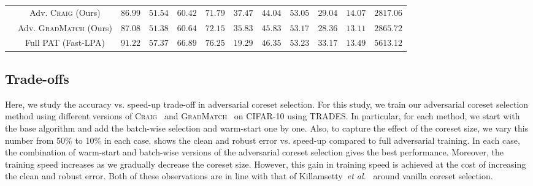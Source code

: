 \documentclass[runningheads]{llncs}
\newcommand{\etal}{\textit{et al.}}
\begin{document}
\begin{sidewaystable}[p!]
\begin{center}
\begin{scriptsize}
\begin{tabular}{cccccccccccc}
				& Adv. \textsc{Craig} (Ours)             & $\mathbf{86.99}$        & $51.54$	& $60.42$	       & $71.79$      & $37.47$	 & $44.04$	  & $\mathbf{53.05}$    & $29.04$    & $14.07$   & $\mathbf{2817.06}$ \\
				& Adv. \textsc{GradMatch} (Ours)         & $\mathbf{87.08}$	       & $51.38$	& $60.64$          & $72.15$      & $35.83$	 & $45.83$	  & $\mathbf{53.17}$    & $28.36$    & $13.11$   & $\mathbf{2865.72}$ \\
				& Full PAT (Fast-LPA)                    & $\mathbf{91.22}$	       & $57.37$    & $66.89$          & $76.25$      & $19.29$	 & $46.35$	  & $\mathbf{53.23}$    & $33.17$    & $13.49$   & $\mathbf{5613.12}$ \\
				\bottomrule
			\end{tabular}
		\end{scriptsize}
	\end{center}
\end{sidewaystable}

\subsection{Trade-offs}
Here, we study the accuracy vs. speed-up trade-off in adversarial coreset selection.
For this study, we train our adversarial coreset selection method using different versions of \textsc{Craig}~\cite{mirzasoleiman2020craig} and \textsc{GradMatch}~\cite{killamsetty2021gradmatch} on CIFAR-10 using TRADES.
In particular, for each method, we start with the base algorithm and add the batch-wise selection and warm-start one by one.
Also, to capture the effect of the coreset size, we vary this number from 50\% to 10\% in each case.
 shows the clean and robust error vs. speed-up compared to full adversarial training.
In each case, the combination of warm-start and batch-wise versions of the adversarial coreset selection gives the best performance.
Moreover, the training speed increases as we gradually decrease the coreset size.
However, this gain in training speed is achieved at the cost of increasing the clean and robust error.
Both of these observations are in line with that of Killamsetty~\etal~\cite{killamsetty2021gradmatch} around vanilla coreset selection.
\end{document}
